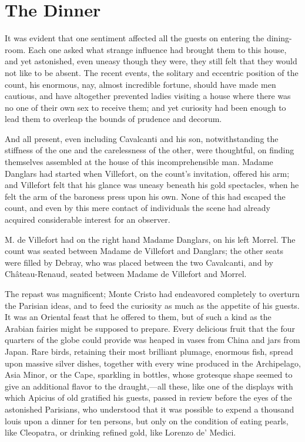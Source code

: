 \chapter{The Dinner}

It was evident that one sentiment affected all the guests on entering
the dining-room. Each one asked what strange influence had brought them
to this house, and yet astonished, even uneasy though they were, they
still felt that they would not like to be absent. The recent events,
the solitary and eccentric position of the count, his enormous, nay,
almost incredible fortune, should have made men cautious, and have
altogether prevented ladies visiting a house where there was no one of
their own sex to receive them; and yet curiosity had been enough to
lead them to overleap the bounds of prudence and decorum.

And all present, even including Cavalcanti and his son, notwithstanding
the stiffness of the one and the carelessness of the other, were
thoughtful, on finding themselves assembled at the house of this
incomprehensible man. Madame Danglars had started when Villefort, on
the count’s invitation, offered his arm; and Villefort felt that his
glance was uneasy beneath his gold spectacles, when he felt the arm of
the baroness press upon his own. None of this had escaped the count,
and even by this mere contact of individuals the scene had already
acquired considerable interest for an observer.

M. de Villefort had on the right hand Madame Danglars, on his left
Morrel. The count was seated between Madame de Villefort and Danglars;
the other seats were filled by Debray, who was placed between the two
Cavalcanti, and by Château-Renaud, seated between Madame de Villefort
and Morrel.

The repast was magnificent; Monte Cristo had endeavored completely to
overturn the Parisian ideas, and to feed the curiosity as much as the
appetite of his guests. It was an Oriental feast that he offered to
them, but of such a kind as the Arabian fairies might be supposed to
prepare. Every delicious fruit that the four quarters of the globe
could provide was heaped in vases from China and jars from Japan. Rare
birds, retaining their most brilliant plumage, enormous fish, spread
upon massive silver dishes, together with every wine produced in the
Archipelago, Asia Minor, or the Cape, sparkling in bottles, whose
grotesque shape seemed to give an additional flavor to the draught,—all
these, like one of the displays with which Apicius of old gratified his
guests, passed in review before the eyes of the astonished Parisians,
who understood that it was possible to expend a thousand louis upon a
dinner for ten persons, but only on the condition of eating pearls,
like Cleopatra, or drinking refined gold, like Lorenzo de’ Medici.

